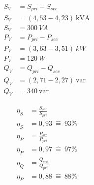 \begin{enumerate}[label=\alph*)]
	      \begin{minipage}[r]{0.5\linewidth}
		      \begin{align*}
			      S_{V} & = S_{pri} - S_{sec}       \\
			      S_{V} & = (4,53 - 4,23)\ \text{kVA} \\
			      S_{V} & = 300\ VA                 \\
			      P_{V} & = P_{pri} - P_{sec}       \\
			      P_{V} & = (3,63 - 3,51)\ kW          \\
			      P_{V} & = 120\ W                   \\
			      Q_{V} & = Q_{pri} - Q_{sec}       \\
			      Q_{V} & = (2,71 - 2,27)\ \text{var} \\
			      Q_{V} & = 340\ \text{var}
		      \end{align*}
	      \end{minipage}
	      \begin{minipage}[l]{0.5\linewidth}
		      \begin{align*}
			      \eta_S & = \frac{S_{sec}}{S_{pri}} \\
			      \eta_S & = 0,93\ \widehat{=}\ 93\% \\
			      \eta_P & = \frac{P_{sec}}{P_{pri}} \\
			      \eta_P & = 0,97\ \widehat{=}\ 97\% \\
			      \eta_Q & = \frac{Q_{sec}}{Q_{pri}} \\
			      \eta_P & = 0,88\ \widehat{=}\ 88\% \\
		      \end{align*}
	      \end{minipage}
	      \pagebreak


\end{enumerate}
